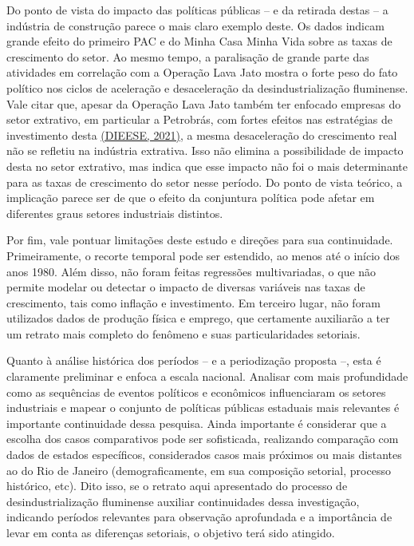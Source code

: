 Do ponto de vista do impacto das políticas públicas -- e da retirada
destas -- a indústria de construção parece o mais claro exemplo deste.
Os dados indicam grande efeito do primeiro PAC e do Minha Casa Minha
Vida sobre as taxas de crescimento do setor. Ao mesmo tempo, a
paralisação de grande parte das atividades em correlação com a Operação
Lava Jato mostra o forte peso do fato político nos ciclos de aceleração
e desaceleração da desindustrialização fluminense. Vale citar que,
apesar da Operação Lava Jato também ter enfocado empresas do setor
extrativo, em particular a Petrobrás, com fortes efeitos nas estratégias
de investimento desta
\href{https://www.zotero.org/google-docs/?X39guU}{(DIEESE, 2021)}, a
mesma desaceleração do crescimento real não se refletiu na indústria
extrativa. Isso não elimina a possibilidade de impacto desta no setor
extrativo, mas indica que esse impacto não foi o mais determinante para
as taxas de crescimento do setor nesse período. Do ponto de vista
teórico, a implicação parece ser de que o efeito da conjuntura política
pode afetar em diferentes graus setores industriais distintos.

Por fim, vale pontuar limitações deste estudo e direções para sua
continuidade. Primeiramente, o recorte temporal pode ser estendido, ao
menos até o início dos anos 1980. Além disso, não foram feitas
regressões multivariadas, o que não permite modelar ou detectar o
impacto de diversas variáveis nas taxas de crescimento, tais como
inflação e investimento. Em terceiro lugar, não foram utilizados dados
de produção física e emprego, que certamente auxiliarão a ter um retrato
mais completo do fenômeno e suas particularidades setoriais.

Quanto à análise histórica dos períodos -- e a periodização proposta --,
esta é claramente preliminar e enfoca a escala nacional. Analisar com
mais profundidade como as sequências de eventos políticos e econômicos
influenciaram os setores industriais e mapear o conjunto de políticas
públicas estaduais mais relevantes é importante continuidade dessa
pesquisa. Ainda importante é considerar que a escolha dos casos
comparativos pode ser sofisticada, realizando comparação com dados de
estados específicos, considerados casos mais próximos ou mais distantes
ao do Rio de Janeiro (demograficamente, em sua composição setorial,
processo histórico, etc). Dito isso, se o retrato aqui apresentado do
processo de desindustrialização fluminense auxiliar continuidades dessa
investigação, indicando períodos relevantes para observação aprofundada
e a importância de levar em conta as diferenças setoriais, o objetivo
terá sido atingido.

